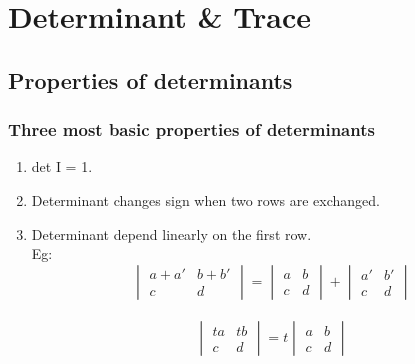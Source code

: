 \section{Determinant \& Trace}

\subsection{Properties of determinants}
\subsubsection{Three most basic properties of determinants}

\begin{enumerate}
\item det I = 1.
\item Determinant changes sign when two rows are exchanged.
\item Determinant depend linearly on the first row.\\
Eg: 
$$
\begin{vmatrix}
	a + a' & b + b'\\
	c & d	
\end{vmatrix}
=
\begin{vmatrix}
	a & b\\
	c & d	
\end{vmatrix}
+
\begin{vmatrix}
	a' & b'\\
	c & d	
\end{vmatrix}
$$\\

$$
\begin{vmatrix}
	ta & tb\\
	c & d
\end{vmatrix}
=
t
\begin{vmatrix}
	a & b\\
	c & d	
\end{vmatrix}
$$
 
\end{enumerate}

